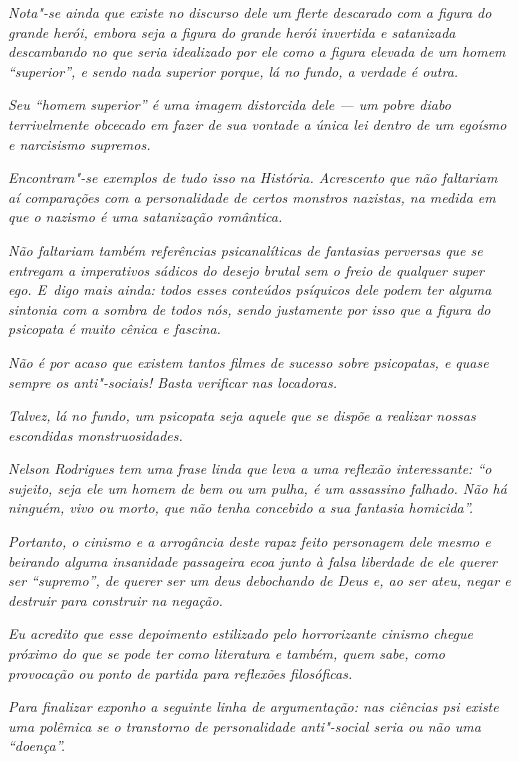 \emph{Nota"-se ainda que existe no discurso dele um flerte descarado com
a figura do grande herói, embora seja a figura do grande herói invertida
e satanizada descambando no que seria idealizado por ele como a figura
elevada de um homem ``superior'', e sendo nada superior porque, lá no
fundo, a verdade é outra.}~

\emph{Seu ``homem superior'' é uma imagem distorcida dele --- um pobre
diabo terrivelmente obcecado em fazer de sua vontade a única lei dentro
de um egoísmo e narcisismo supremos.}~

\emph{Encontram"-se exemplos de tudo isso na História. Acrescento que não
faltariam aí comparações com a personalidade de certos monstros
nazistas, na medida em que o nazismo é uma satanização romântica.}~

\emph{Não faltariam também referências psicanalíticas de fantasias
perversas que se entregam a imperativos sádicos do desejo brutal sem o
freio de qualquer super ego. E~digo mais ainda: todos esses conteúdos
psíquicos dele podem ter alguma sintonia com a sombra de todos nós,
sendo justamente por isso que a figura do psicopata é muito cênica e
fascina.}~

\emph{Não é por acaso que existem tantos filmes de sucesso sobre
psicopatas, e quase sempre os anti"-sociais! Basta verificar nas
locadoras.}~

\emph{Talvez, lá no fundo, um psicopata seja aquele que se dispõe a
realizar nossas escondidas monstruosidades.}~

\emph{Nelson Rodrigues tem uma frase linda que leva a uma reflexão
interessante: ``o sujeito, seja ele um homem de bem ou um pulha, é um
assassino falhado. Não há ninguém, vivo ou morto, que não tenha
concebido a sua fantasia homicida''.}~

\emph{Portanto, o cinismo e a arrogância deste rapaz feito personagem
dele mesmo e beirando alguma insanidade passageira ecoa junto à falsa
liberdade de ele querer ser ``supremo'', de querer ser um deus
debochando de Deus e, ao ser ateu, negar e destruir para construir na
negação.}~

\emph{Eu acredito que esse depoimento estilizado pelo horrorizante
cinismo chegue próximo do que se pode ter como literatura e também, quem
sabe, como provocação ou ponto de partida para reflexões filosóficas.}~

\emph{Para finalizar exponho a seguinte linha de argumentação: nas
ciências psi existe uma polêmica se o transtorno de personalidade
anti"-social seria ou não uma ``doença''.}~

